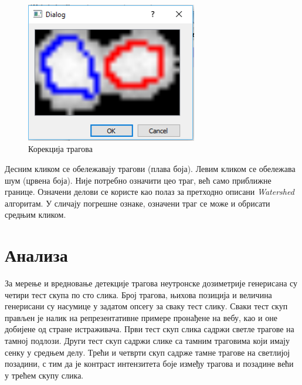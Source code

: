 \documentclass[11pt,a4paper,serbian,oneside]{book}
\begin{document}
\begin{figure}[H]
\begin{center}
\includegraphics[width=75mm]{images/uredi.png}
\end{center}
\caption{Корекција трагова}
\label{fig:mark}
\end{figure}

Десним кликом се обележавају трагови (плава боја). Левим кликом се обележава шум (црвена боја). Није потребно означити цео траг, већ само приближне границе.
Означени делови се користе као полаз за претходно описани \textit{Watershed} алгоритам. У сличају погрешне ознаке, означени траг се може и обрисати средњим кликом.

%
%
%

\chapter{Анализа}

За мерење и вредновање детекције трагова неутронске дозиметрије генерисана су четири тест скупа по сто слика. Број трагова, њихова позиција и величина генерисани су насумице у задатом опсегу за сваку тест слику. Сваки тест скуп прављен је налик на репрезентативне примере пронађене на вебу, као и оне добијене од стране истраживача. Први тест скуп слика садржи светле трагове на тамној подлози. Други тест скуп садржи слике са тамним траговима који имају сенку у средњем делу. Трећи и четврти скуп садрже тамне трагове на светлијој позадини, с тим да је контраст интензитета боје између трагова и позадине већи у трећем скупу слика.
\end{document}

